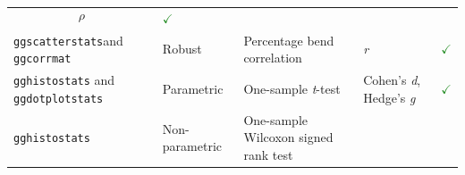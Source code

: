 \documentclass[]{article}
\begin{document}
\begin{longtable}[]{@{}lllll@{}}
\begin{minipage}[t]{0.12\columnwidth}
\[\rho\]\strut
\end{minipage} & \begin{minipage}[t]{0.07\columnwidth}\raggedright
\textcolor{ForestGreen}{$\checkmark$}\strut
\end{minipage}\tabularnewline
\begin{minipage}[t]{0.20\columnwidth}\raggedright
\texttt{ggscatterstats}and \texttt{ggcorrmat}\strut
\end{minipage} & \begin{minipage}[t]{0.16\columnwidth}\raggedright
Robust\strut
\end{minipage} & \begin{minipage}[t]{0.31\columnwidth}\raggedright
Percentage bend correlation\strut
\end{minipage} & \begin{minipage}[t]{0.12\columnwidth}\raggedright
\emph{r}\strut
\end{minipage} & \begin{minipage}[t]{0.07\columnwidth}\raggedright
\textcolor{ForestGreen}{$\checkmark$}\strut
\end{minipage}\tabularnewline
\begin{minipage}[t]{0.20\columnwidth}\raggedright
\texttt{gghistostats} and \texttt{ggdotplotstats}\strut
\end{minipage} & \begin{minipage}[t]{0.16\columnwidth}\raggedright
Parametric\strut
\end{minipage} & \begin{minipage}[t]{0.31\columnwidth}\raggedright
One-sample \emph{t}-test\strut
\end{minipage} & \begin{minipage}[t]{0.12\columnwidth}\raggedright
Cohen's \emph{d}, Hedge's \emph{g}\strut
\end{minipage} & \begin{minipage}[t]{0.07\columnwidth}\raggedright
\textcolor{ForestGreen}{$\checkmark$}\strut
\end{minipage}\tabularnewline
\begin{minipage}[t]{0.20\columnwidth}\raggedright
\texttt{gghistostats}\strut
\end{minipage} & \begin{minipage}[t]{0.16\columnwidth}\raggedright
Non-parametric\strut
\end{minipage} & \begin{minipage}[t]{0.31\columnwidth}\raggedright
One-sample Wilcoxon signed rank test\strut
\end{minipage} & \begin{minipage}[t]{0.12\columnwidth}\raggedright

\end{minipage}
\end{longtable}
\end{document}
